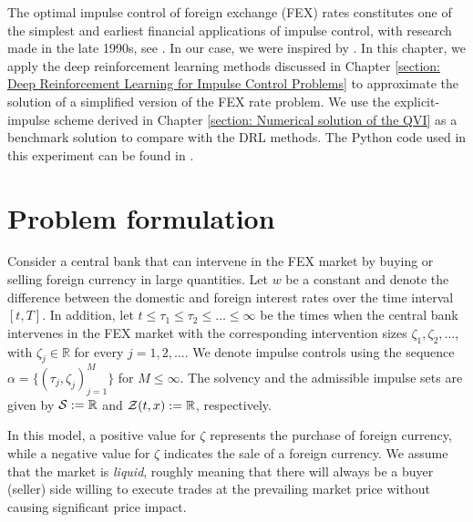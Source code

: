 \label{section: Numerical Experiment I: Impulse Control of the Foreign Exchange Rate}
The optimal impulse control of foreign exchange (FEX) rates constitutes one of the simplest and earliest financial applications of impulse control, with research made in the late 1990s, see \cite{mundaca1998optimal, cadenillas1999optimal, cadenillas2000classical}. In our case, we were inspired by \cite[Chapter 5]{azimzadeh2018impulsecontrolfinancenumerical}. In this chapter, we apply the deep reinforcement learning methods discussed in Chapter \ref{section: Deep Reinforcement Learning for Impulse Control Problems} to approximate the solution of a simplified version of the FEX rate problem. We use the explicit-impulse scheme derived in Chapter \ref{section: Numerical solution of the QVI} as a benchmark solution to compare with the DRL methods. The Python code used in this experiment can be found in \cite{mycode}.

\section{Problem formulation}
Consider a central bank that can intervene in the FEX market by buying or selling foreign currency in large quantities. Let $w$ be a constant and denote the difference between the domestic and foreign interest rates over the time interval $[t,T]$. In addition, let $t \leq \tau_1 \leq \tau_2 \leq \ldots \leq \infty$ be the times when the central bank intervenes in the FEX market with the corresponding intervention sizes $\zeta_1, \zeta_2, \ldots$, with $\zeta_j \in \mathbb R$ for every $j = 1, 2, \ldots$. We denote impulse controls using the sequence $\alpha=\{(\tau_j, \zeta_j)_{j=1}^M\}$ for $M \leq \infty$. The solvency and the admissible impulse sets are given by $\mathcal{S}:= \mathbb{R}$ and $\mathcal{Z}(t,x) := \mathbb{R}$, respectively.

In this model, a positive value for $\zeta$ represents the purchase of foreign currency, while a negative value for $\zeta$ indicates the sale of a foreign currency. We assume that the market is \emph{liquid}, roughly meaning that there will always be a buyer (seller) side willing to execute trades at the prevailing market price without causing significant price impact.

